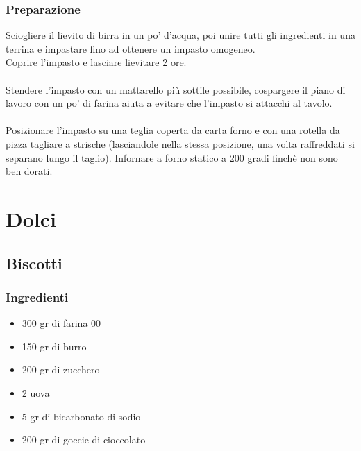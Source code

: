 \documentclass[12pt, a4paper]{article}
\begin{document}
\subsubsection{Preparazione}
	Sciogliere il lievito di birra in un po' d'acqua, poi unire tutti
	gli ingredienti in una terrina e impastare fino ad ottenere 
	un impasto omogeneo.\\
	Coprire l'impasto e lasciare lievitare 2 ore.\\\\
	Stendere l'impasto con un mattarello più sottile possibile,
	cospargere il piano di lavoro con un po' di farina aiuta a evitare
	che l'impasto si attacchi al tavolo.\\\\
	Posizionare l'impasto su una teglia coperta da carta forno e con
	una rotella da pizza tagliare a strische (lasciandole nella stessa
	posizione, una volta raffreddati si separano lungo il taglio).
	Infornare a forno statico a 200 gradi finchè non sono ben dorati.
\clearpage

\section{Dolci}

\subsection{Biscotti}

\subsubsection{Ingredienti}
\begin{itemize}
\item 300 gr di farina 00
\item	150 gr di burro
\item	200 gr di zucchero
\item	2 uova
\item	5 gr di bicarbonato di sodio
\item	200 gr di goccie di cioccolato
\end{itemize}
\end{document}
